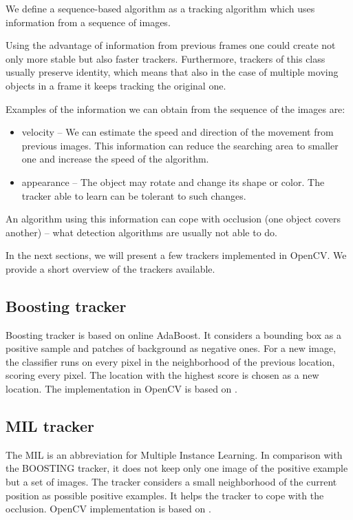 We define a sequence-based algorithm as a tracking algorithm which uses
information from a sequence of images.

Using the advantage of information from previous frames one could create not
only more stable but also faster trackers. Furthermore, trackers of this class
usually preserve identity, which means that also in the case of multiple moving
objects in a frame it keeps tracking the original one.

Examples of the information we can obtain from the sequence of the images are:
\begin{itemize}
\item velocity -- We can estimate the speed and direction of
  the movement from previous images. This information can reduce the searching area to smaller one
  and increase the speed of the algorithm.
\item appearance -- The object may rotate and change its shape or color. The tracker able to
  learn can be tolerant to such changes.
\end{itemize}

An algorithm using this information can cope with occlusion (one object covers
another) -- what detection algorithms are usually not able to do.

In the next sections, we will present a few trackers implemented in OpenCV. We
provide a short overview of the trackers available.

\subsection*{Boosting tracker}
Boosting tracker is based on online AdaBoost. It considers a bounding box as a
positive sample and patches of background as negative ones. For a new image,
the classifier runs on every pixel in the neighborhood of the previous
location, scoring every pixel. The location with the highest score is chosen as
a new location. The implementation in OpenCV is based on \citet*{boosting}.

\subsection*{MIL tracker}
The MIL is an abbreviation for Multiple Instance Learning. In comparison with
the BOOSTING tracker, it does not keep only one image of the positive example
but a set of images. The tracker considers a small neighborhood of the current
position as possible positive examples. It helps the tracker to cope with the
occlusion. OpenCV implementation is based on \citet*{mil}.

